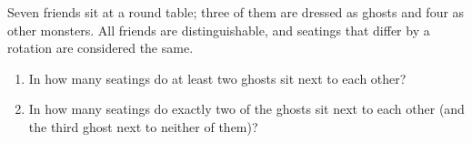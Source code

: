 Seven friends sit at a round table; three of them are dressed as ghosts and four as other monsters. All friends are distinguishable, and seatings that differ by a rotation are considered the same.
\begin{enumerate}
\item[(a)] In how many seatings do at least two ghosts sit next to each other?
\item[(b)] In how many seatings do exactly two of the ghosts sit next to each other (and the third ghost next to neither of them)?
\end{enumerate}
